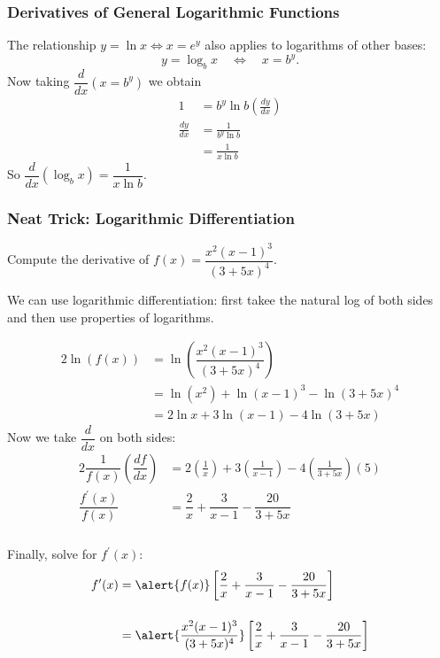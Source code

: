 \documentclass[14pt]{beamer}
\begin{document}
\begin{frame}
\frametitle{\small Derivatives of General Logarithmic Functions}
\footnotesize
The relationship $y=\ln x \Longleftrightarrow x=e^y$ also applies to logarithms of other bases:
\[y=\log_b x \quad\Longleftrightarrow\quad x=b^y.\]
Now taking $\dfrac{d}{dx}\left(x=b^y\right)$ we obtain
\begin{align*}
1 &= b^y\ln b\left(\frac{dy}{dx}\right) \\
\frac{dy}{dx} &= \frac{1}{b^y \ln b} \\[0.5pc]
 &=\frac{1}{x \ln b}
\end{align*}
\bigskip
So $\dfrac{d}{dx}(\log_b x)=\dfrac{1}{x \ln b}.$
\end{frame}

\begin{frame}
\frametitle{Neat Trick: Logarithmic Differentiation}
\begin{ex}  Compute the derivative of $f(x)=\dfrac{x^2(x-1)^3}{(3+5x)^4}$. \end{ex}

We can use logarithmic differentiation: first takee the natural log of both sides and then use properties of logarithms.
\end{frame}

\begin{frame}
\small
\begin{alignat*}{2}
\ln(f(x)) &= \ln \left( \dfrac{x^2(x-1)^3}{(3+5x)^4} \right) \\[0.5pc]
&= \ln{(x^2)} + \ln{(x-1)^3}-\ln{(3+5x)^4} \\[0.5pc]
&= 2\ln x + 3\ln(x-1)-4\ln(3+5x)
\end{alignat*}
\alert{Now} we take $\dfrac{d}{dx}$ on both sides:
\begin{alignat*}{2}
\dfrac{1}{f(x)}\left(\dfrac{df}{dx}\right) &= 2\left(\frac{1}{x}\right) + 3\left(\frac{1}{x-1}\right) - 4\left(\frac{1}{3+5x}\right)(5) \\[1pc]
\dfrac{f^{\prime}(x)}{f(x)} &= \dfrac{2}{x} + \dfrac{3}{x-1} - \dfrac{20}{3+5x}
\end{alignat*}
\end{frame}

\begin{frame}
\frametitle{}
Finally, solve for $f^{\prime}(x)$:
\begin{alignat*}{2}
f^{\prime}(x) &= \alert{f(x)} \left[ \dfrac{2}{x} + \dfrac{3}{x-1} - \dfrac{20}{3+5x} \right] \\[1pc]
&= \alert{\frac{x^2 (x-1)^3}{(3+5x)^4}} \left[ \dfrac{2}{x} + \dfrac{3}{x-1} - \dfrac{20}{3+5x} \right]
\end{alignat*}
\end{frame}
\end{document}
